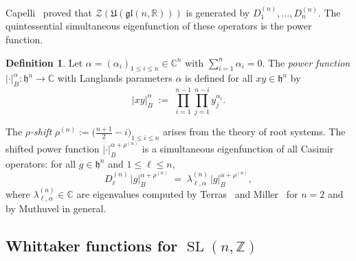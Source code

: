 \documentclass[12pt, reqno, oneside]{amsart}
\theoremstyle{definition}
\newtheorem{definition}[theorem]{Definition}
\numberwithin{equation}{section}
\newcommand{\Z}{\mathbb{Z}}
\newcommand{\R}{\mathbb{R}}
\newcommand{\C}{\mathbb{C}}
\newcommand{\hh}{\mathfrak{h}}
\newcommand{\gl}{\mathfrak{gl}}
\DeclareMathOperator{\SL}{SL}
\begin{document}
Capelli~\cite{Cap87} proved that $\mathcal{Z}(\mathfrak{U}(\gl(n,\R)))$
is generated by $D_1^{(n)},\ldots,D_n^{(n)}$. The quintessential
simultaneous eigenfunction of these operators is the power function.

\begin{definition}\label{def:power-function}
Let $\alpha=(\alpha_i)_{1\leq i\leq n}\in\C^n$ with $\sum_{i=1}^n
\alpha_i=0$. The \emph{power function} $|\cdot|_B^\alpha:\hh^n\to\C$ with
Langlands parameters $\alpha$ is defined for all $xy\in\hh^n$ by
\[
  |xy|_B^\alpha \;:=\; \prod_{i=1}^{n-1}\prod_{j=1}^{n-i} y_j^{\alpha_i}.
\]
\end{definition}

The \emph{$\rho$-shift} $\rho^{(n)}:=\bigl(\frac{n+1}{2}-i\bigr)_{1\leq
i\leq n}$ arises from the theory of root systems. The shifted power
function $|\cdot|_B^{\alpha+\rho^{(n)}}$ is a simultaneous eigenfunction
of all Casimir operators: for all $g\in\hh^n$ and $1\leq\ell\leq n$,
\begin{equation}\label{eq:power-eigenfunction}
  D_\ell^{(n)}\,|g|_B^{\alpha+\rho^{(n)}}
  \;=\;
  \lambda_{\ell,\alpha}^{(n)}\,|g|_B^{\alpha+\rho^{(n)}},
\end{equation}
where $\lambda_{\ell,\alpha}^{(n)}\in\C$ are eigenvalues computed by
Terras~\cite{Ter88} and Miller~\cite{Mil97} for $n=2$ and by Muthuvel \cite{Mut26} in general.

\subsection{Whittaker functions for \texorpdfstring{$\SL(n,\Z)$}{SL(n,Z)}}
\end{document}
